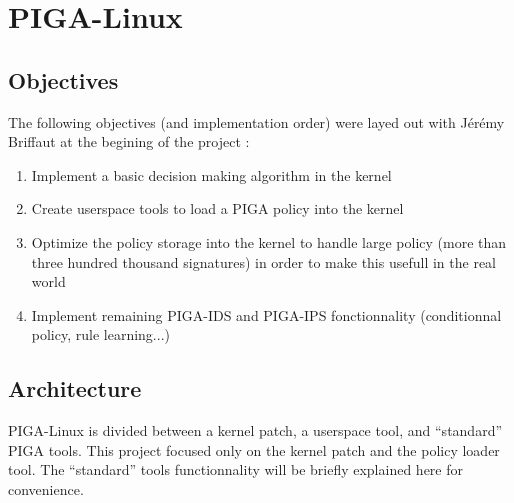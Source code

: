 \documentclass[pdftex,a4paper,titlepage,11pt]{article}
\begin{document}






\newpage

\section{PIGA-Linux}

\subsection{Objectives}

The following objectives (and implementation order) were layed out with Jérémy Briffaut at the begining of the project :

\begin{enumerate}
	\item Implement a basic decision making algorithm in the kernel
	\item Create userspace tools to load a PIGA policy into the kernel
	\item Optimize the policy storage into the kernel to handle large policy (more than three hundred thousand signatures) in order to make this usefull in the real world
	\item Implement remaining PIGA-IDS and PIGA-IPS fonctionnality (conditionnal policy, rule learning...)
\end{enumerate}

\subsection{Architecture}

PIGA-Linux is divided between a kernel patch, a userspace tool, and ``standard'' PIGA tools. This project focused only on the kernel patch and the policy loader tool. The ``standard'' tools functionnality will be briefly explained here for convenience.
\end{document}
